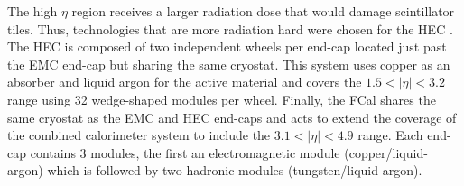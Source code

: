 The high $\eta$ region receives a larger radiation dose that would damage
scintillator tiles. Thus, technologies that are more radiation hard were chosen
for the HEC \cite{CERN-LHCC-96-041}. The HEC is composed of two independent
wheels per end-cap located just past the EMC end-cap but sharing the same
cryostat. This system  uses copper as an absorber and liquid argon for the
active material and covers the $1.5 < |\eta| < 3.2$ range using 32 wedge-shaped
modules per wheel. Finally, the FCal shares the same cryostat as the EMC and
HEC end-caps and acts to extend the coverage of the combined calorimeter system
to include the $3.1 < |\eta| < 4.9$ range.  Each end-cap contains 3 modules,
the first an electromagnetic module (copper/liquid-argon) which is followed by
two hadronic modules (tungsten/liquid-argon).
